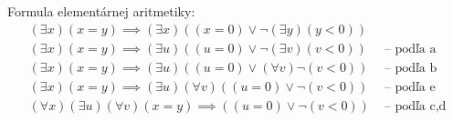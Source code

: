 \begin{priklad}
    Formula elementárnej aritmetiky:
    \begin{align*}
        (\exists x) (x=y) \implies (\exists x)((x=0) \lor
                    \neg (\exists y)(y<0))& \\
        (\exists x) (x=y) \implies (\exists u)((u=0) \lor
                    \neg (\exists v)(v<0)) &\mbox{ -- podľa a}\\
        (\exists x) (x=y) \implies (\exists u)((u=0) \lor
                    (\forall  v) \neg(v<0)) &\mbox{ -- podľa b}\\
        (\exists x) (x=y) \implies (\exists u)(\forall v)
                ((u=0) \lor \neg(v<0)) &\mbox{ -- podľa e}\\
        (\forall x)(\exists u)(\forall v) (x=y) \implies 
                ((u=0) \lor \neg(v<0)) &\mbox{ -- podľa c,d}
    \end{align*}
\end{priklad}

